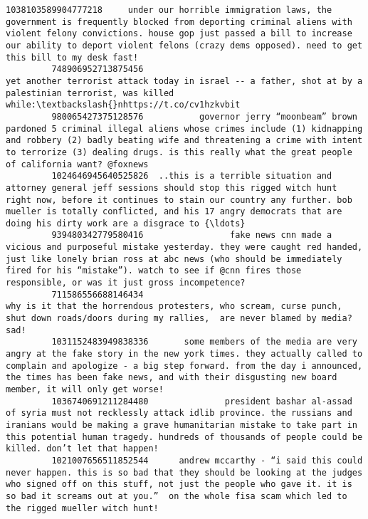\documentclass[11pt]{article}
\begin{document}
\begin{Verbatim}[commandchars=\\\{\}]
         1038103589904777218     under our horrible immigration laws, the government is frequently blocked from deporting criminal aliens with violent felony convictions. house gop just passed a bill to increase our ability to deport violent felons (crazy dems opposed). need to get this bill to my desk fast!   
         748906952713875456                                                                                                                                                  yet another terrorist attack today in israel -- a father, shot at by a palestinian terrorist, was killed while:\textbackslash{}nhttps://t.co/cv1hzkvbit   
         980065427375128576           governor jerry “moonbeam” brown pardoned 5 criminal illegal aliens whose crimes include (1) kidnapping and robbery (2) badly beating wife and threatening a crime with intent to terrorize (3) dealing drugs. is this really what the great people of california want? @foxnews   
         1024646945640525826  ..this is a terrible situation and attorney general jeff sessions should stop this rigged witch hunt right now, before it continues to stain our country any further. bob mueller is totally conflicted, and his 17 angry democrats that are doing his dirty work are a disgrace to {\ldots}   
         939480342779580416                 fake news cnn made a vicious and purposeful mistake yesterday. they were caught red handed, just like lonely brian ross at abc news (who should be immediately fired for his “mistake”). watch to see if @cnn fires those responsible, or was it just gross incompetence?   
         711586556688146434                                                                                                                                              why is it that the horrendous protesters, who scream, curse punch, shut down roads/doors during my rallies,  are never blamed by media? sad!   
         1031152483949838336       some members of the media are very angry at the fake story in the new york times. they actually called to complain and apologize - a big step forward. from the day i announced, the times has been fake news, and with their disgusting new board member, it will only get worse!   
         1036740691211284480               president bashar al-assad of syria must not recklessly attack idlib province. the russians and iranians would be making a grave humanitarian mistake to take part in this potential human tragedy. hundreds of thousands of people could be killed. don’t let that happen!   
         1021007656511852544      andrew mccarthy - “i said this could never happen. this is so bad that they should be looking at the judges who signed off on this stuff, not just the people who gave it. it is so bad it screams out at you.”  on the whole fisa scam which led to the rigged mueller witch hunt!   

\end{Verbatim}
\end{document}
